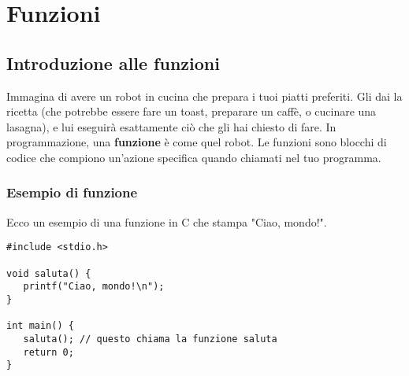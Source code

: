 \section{Funzioni}
\label{ch:funzioni}

\subsection{Introduzione alle funzioni}
Immagina di avere un robot in cucina che prepara i tuoi piatti preferiti. Gli dai la ricetta (che potrebbe essere fare un toast, preparare un caffè, o cucinare una lasagna), e lui eseguirà esattamente ciò che gli hai chiesto di fare. In programmazione, una \textbf{funzione} è come quel robot. Le funzioni sono blocchi di codice che compiono un'azione specifica quando chiamati nel tuo programma.

\subsubsection{Esempio di funzione}
Ecco un esempio di una funzione in C che stampa "Ciao, mondo!".

\begin{lstlisting}[style=codeSnippet]
#include <stdio.h>

void saluta() {
   printf("Ciao, mondo!\n");
}

int main() {
   saluta(); // questo chiama la funzione saluta
   return 0;
}
\end{lstlisting}

